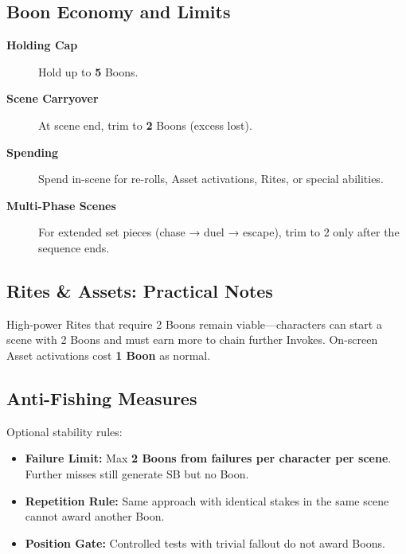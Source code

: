 \subsection{Boon Economy and Limits}
\label{subsec:boon-economy}
\begin{description}
\item[\textbf{Holding Cap}] Hold up to \textbf{5} Boons. 
\item[\textbf{Scene Carryover}] At scene end, trim to \textbf{2} Boons (excess lost). 
\item[\textbf{Spending}] Spend in-scene for re-rolls, Asset activations, Rites, or special abilities. 
\item[\textbf{Multi-Phase Scenes}] For extended set pieces (chase → duel → escape), trim to 2 only after the sequence ends. 
\end{description}

\subsection{Rites \& Assets: Practical Notes}
\label{subsec:rite-asset-notes}
High-power Rites that require 2 Boons remain viable—characters can start a scene with 2 Boons and must earn more to chain further Invokes. On-screen Asset activations cost \textbf{1 Boon} as normal. 

\subsection{Anti-Fishing Measures}
\label{subsec:anti-fishing}
Optional stability rules:
\begin{itemize}
\item \textbf{Failure Limit:} Max \textbf{2 Boons from failures per character per scene}. Further misses still generate SB but no Boon.
\item \textbf{Repetition Rule:} Same approach with identical stakes in the same scene cannot award another Boon.
\item \textbf{Position Gate:} Controlled tests with trivial fallout do not award Boons.
\end{itemize}

